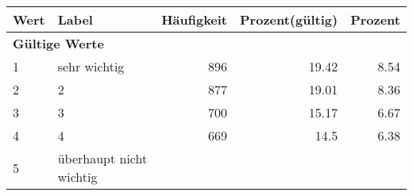      \begin{longtable}{lXrrr}
     \toprule
     \textbf{Wert} & \textbf{Label} & \textbf{Häufigkeit} & \textbf{Prozent(gültig)} & \textbf{Prozent} \\
     \endhead
     \midrule
     \multicolumn{5}{l}{\textbf{Gültige Werte}}\\

     1 &
     \multicolumn{1}{X}{ sehr wichtig   } &


       \num{896} &
       \num[round-mode=places,round-precision=2]{19.42} &
         \num[round-mode=places,round-precision=2]{8.54} \\

     2 &
     \multicolumn{1}{X}{ 2   } &


       \num{877} &
       \num[round-mode=places,round-precision=2]{19.01} &
         \num[round-mode=places,round-precision=2]{8.36} \\

     3 &
     \multicolumn{1}{X}{ 3   } &


       \num{700} &
       \num[round-mode=places,round-precision=2]{15.17} &
         \num[round-mode=places,round-precision=2]{6.67} \\

     4 &
     \multicolumn{1}{X}{ 4   } &


       \num{669} &
       \num[round-mode=places,round-precision=2]{14.5} &
         \num[round-mode=places,round-precision=2]{6.38} \\

     5 &
     \multicolumn{1}{X}{ überhaupt nicht wichtig   } &



\end{longtable}
